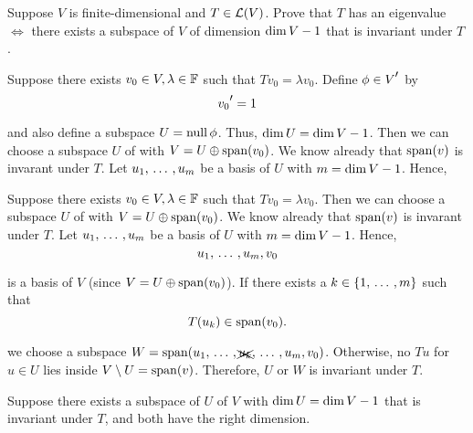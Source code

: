 \begin{xrcs}
  Suppose $V$ is finite-dimensional and $T \in \mathcal{L}(V)$. Prove that $T$ has an eigenvalue $\iff$ there exists a subspace of $V$ of dimension $\operatorname{dim} V - 1$ that is invariant under $T$.
  \begin{xprf}
    Suppose there exists $v_0 \in V, \lambda \in \mathbb{F}$ such that $Tv_0 = \lambda v_0$. Define $\phi \in \dual{V}$ by
    \begin{equation}
      \dual{v_0} = 1
    \end{equation}

    and also define a subspace $U = \operatorname{null} \phi$. Thus, $\operatorname{dim} U = \operatorname{dim} V - 1$.
    Then we can choose a subspace $U$ of with $V = U \oplus \operatorname{span} (v_0)$. We know already that $\operatorname{span} (v)$ is invarant under $T$. Let $u_1, {\, \ldots \,\,}, u_{m}$ be a basis of $U$ with $m = \operatorname{dim} V - 1$. Hence,
  \end{xprf}
  \begin{xprf}
    \Rightarrowdirection Suppose there exists $v_0 \in V, \lambda \in \mathbb{F}$ such that $Tv_0 = \lambda v_0$. Then we can choose a subspace $U$ of with $V = U \oplus \operatorname{span} (v_0)$. We know already that $\operatorname{span} (v)$ is invarant under $T$. Let $u_1, {\, \ldots \,\,}, u_{m}$ be a basis of $U$ with $m = \operatorname{dim} V - 1$. Hence,
    \begin{equation}
      u_1, {\, \ldots \,\,}, u_{m}, v_0
    \end{equation}

    is a basis of $V$ (since $V = U \oplus \operatorname{span} (v_0)$). If there exists a $k \in \{1, {\, \ldots \,\,}, m\}$ such that
    \begin{equation}
      T(u_k) \in \operatorname{span} (v_0).
    \end{equation}

    we choose a subspace $W = \operatorname{span} (u_1, {\, \ldots \,\,}, \xcancel{u_k}, {\, \ldots \,\,}, u_m, v_0)$. Otherwise, no $T u$ for $u \in U$ lies inside $V \setminus U = \operatorname{span} (v)$. Therefore, $U$ or $W$ is invariant under $T$.

    \Leftarrowdirection Suppose there exists a subspace of $U$ of $V$ with $\operatorname{dim} U = \operatorname{dim} V - 1$ that is invariant under $T$, and both have the right dimension.
  \end{xprf}
\end{xrcs}